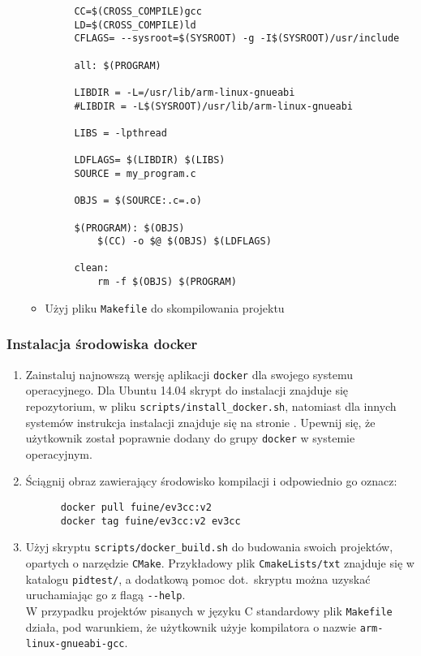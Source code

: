 \documentclass{article}
\begin{document}
\begin{enumerate}
\begin{itemize}
\begin{verbatim}
     CC=$(CROSS_COMPILE)gcc
     LD=$(CROSS_COMPILE)ld
     CFLAGS= --sysroot=$(SYSROOT) -g -I$(SYSROOT)/usr/include

     all: $(PROGRAM)

     LIBDIR = -L=/usr/lib/arm-linux-gnueabi
     #LIBDIR = -L$(SYSROOT)/usr/lib/arm-linux-gnueabi

     LIBS = -lpthread

     LDFLAGS= $(LIBDIR) $(LIBS)
     SOURCE = my_program.c

     OBJS = $(SOURCE:.c=.o)

     $(PROGRAM): $(OBJS)
         $(CC) -o $@ $(OBJS) $(LDFLAGS)

     clean:
         rm -f $(OBJS) $(PROGRAM)
            \end{verbatim}

  \item Użyj pliku \texttt{Makefile} do skompilowania projektu
    \end{itemize}
\end{enumerate}
\subsubsection*{Instalacja środowiska docker}\label{instr_docker}
\begin{enumerate}
\def\labelenumi{\arabic{enumi}.}
\item
  Zainstaluj najnowszą wersję aplikacji \texttt{docker} dla swojego systemu
  operacyjnego. Dla Ubuntu 14.04 skrypt do instalacji znajduje się
  repozytorium, w pliku \texttt{scripts/install\_docker.sh}, natomiast dla
  innych systemów instrukcja instalacji znajduje się na stronie
  \href{https://docs.docker.com/engine/installation/}{}. Upewnij się, że
  użytkownik został poprawnie dodany do grupy \texttt{docker} w systemie
  operacyjnym.
\item
  Ściągnij obraz zawierający środowisko kompilacji i odpowiednio go
  oznacz:

  \begin{verbatim}
      docker pull fuine/ev3cc:v2
      docker tag fuine/ev3cc:v2 ev3cc
\end{verbatim}
\item
  Użyj skryptu \texttt{scripts/docker\_build.sh} do budowania swoich projektów,
  opartych o narzędzie \texttt{CMake}. Przykładowy plik \texttt{CmakeLists/txt}
  znajduje się w katalogu \texttt{pidtest/}, a dodatkową pomoc dot.\ skryptu
  można uzyskać uruchamiając go z flagą \texttt{-\/-help}.\\ W przypadku
  projektów pisanych w języku C standardowy plik \texttt{Makefile} działa, pod
  warunkiem, że użytkownik użyje kompilatora o nazwie
  \texttt{arm-linux-gnueabi-gcc}.
\end{enumerate}
\end{document}
